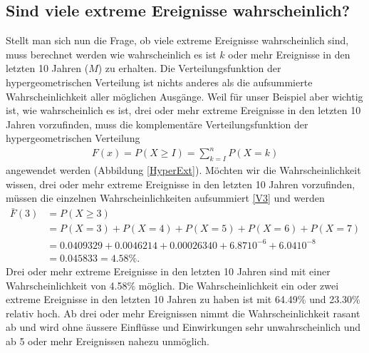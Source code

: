 \begin{refsection}
\subsection{Sind viele extreme Ereignisse wahrscheinlich?}
Stellt man sich nun die Frage, ob viele extreme Ereignisse wahrscheinlich sind, muss berechnet werden wie wahrscheinlich es ist $k$ oder mehr Ereignisse in den letzten 10 Jahren ($M$) zu erhalten. 
Die Verteilungsfunktion der hypergeometrischen Verteilung ist nichts anderes als die aufsummierte Wahrscheinlichkeit aller möglichen Ausgänge. Weil für unser Beispiel aber wichtig ist, wie wahrscheinlich es ist, drei oder mehr extreme Ereignisse in den letzten 10 Jahren vorzufinden, muss die komplementäre Verteilungsfunktion der hypergeometrischen Verteilung
\begin{align*}
F(x) = P(X \ge I ) = \sum \limits_{k=I}^n P(X = k)
\end{align*}
%
angewendet werden (Abbildung \ref{HyperExt}). 
Möchten wir die Wahrscheinlichkeit wissen, drei oder mehr extreme Ereignisse in den letzten 10 Jahren vorzufinden, müssen die einzelnen Wahrscheinlichkeiten aufsummiert \eqref{V3} und werden
%
\begin{equation}
\begin{aligned}
\bar{F}(3) &=  P(X \ge 3) \\
&= P(X = 3) + P(X = 4) + P(X = 5) + P(X = 6) + P(X = 7) \\
&= 0.0409329 + 0.0046214 + 0.00026340 + 6.87 10^{ -6 } + 6.04 10^{ -8 } \\
&= 0.045833 = 4.58\%.
\label{V3}
\end{aligned}
\end{equation}
%
Drei oder mehr extreme Ereignisse in den letzten 10 Jahren sind mit einer Wahrscheinlichkeit von 4.58\% möglich. 
Die Wahrscheinlichkeit ein oder zwei extreme Ereignisse in den letzten 10 Jahren zu haben ist mit 64.49\% und 23.30\% relativ hoch. Ab drei oder mehr Ereignissen nimmt die Wahrscheinlichkeit rasant ab und wird ohne äussere Einflüsse und Einwirkungen sehr unwahrscheinlich und ab 5 oder mehr Ereignissen nahezu unmöglich.
%
\begin{table}
\centering
{}
\end{table}
\end{refsection}
